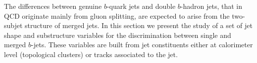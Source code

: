 The differences between genuine $b$-quark jets and double $b$-hadron jets, that in QCD originate mainly from gluon splitting, are expected to arise from the two-subjet structure of merged jets. In this section we present the study of a set of jet shape and substructure variables for the discrimination between single and merged $b$-jets. These variables are  built from jet constituents either at calorimeter level (topological clusters) or tracks associated to the jet.






